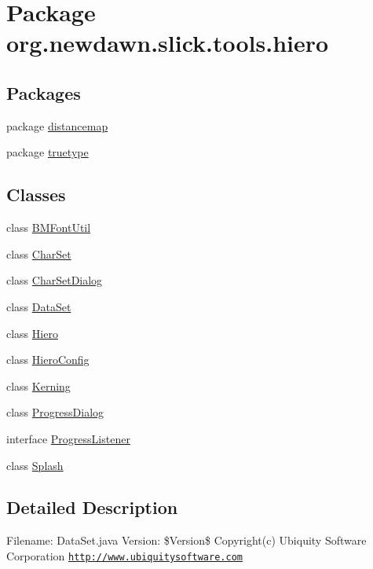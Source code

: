 \hypertarget{namespaceorg_1_1newdawn_1_1slick_1_1tools_1_1hiero}{}\section{Package org.\+newdawn.\+slick.\+tools.\+hiero}
\label{namespaceorg_1_1newdawn_1_1slick_1_1tools_1_1hiero}
\subsection*{Packages}
\begin{DoxyCompactItemize}
\item 
package \mbox{\hyperlink{namespaceorg_1_1newdawn_1_1slick_1_1tools_1_1hiero_1_1distancemap}{distancemap}}
\item 
package \mbox{\hyperlink{namespaceorg_1_1newdawn_1_1slick_1_1tools_1_1hiero_1_1truetype}{truetype}}
\end{DoxyCompactItemize}
\subsection*{Classes}
\begin{DoxyCompactItemize}
\item 
class \mbox{\hyperlink{classorg_1_1newdawn_1_1slick_1_1tools_1_1hiero_1_1_b_m_font_util}{B\+M\+Font\+Util}}
\item 
class \mbox{\hyperlink{classorg_1_1newdawn_1_1slick_1_1tools_1_1hiero_1_1_char_set}{Char\+Set}}
\item 
class \mbox{\hyperlink{classorg_1_1newdawn_1_1slick_1_1tools_1_1hiero_1_1_char_set_dialog}{Char\+Set\+Dialog}}
\item 
class \mbox{\hyperlink{classorg_1_1newdawn_1_1slick_1_1tools_1_1hiero_1_1_data_set}{Data\+Set}}
\item 
class \mbox{\hyperlink{classorg_1_1newdawn_1_1slick_1_1tools_1_1hiero_1_1_hiero}{Hiero}}
\item 
class \mbox{\hyperlink{classorg_1_1newdawn_1_1slick_1_1tools_1_1hiero_1_1_hiero_config}{Hiero\+Config}}
\item 
class \mbox{\hyperlink{classorg_1_1newdawn_1_1slick_1_1tools_1_1hiero_1_1_kerning}{Kerning}}
\item 
class \mbox{\hyperlink{classorg_1_1newdawn_1_1slick_1_1tools_1_1hiero_1_1_progress_dialog}{Progress\+Dialog}}
\item 
interface \mbox{\hyperlink{interfaceorg_1_1newdawn_1_1slick_1_1tools_1_1hiero_1_1_progress_listener}{Progress\+Listener}}
\item 
class \mbox{\hyperlink{classorg_1_1newdawn_1_1slick_1_1tools_1_1hiero_1_1_splash}{Splash}}
\end{DoxyCompactItemize}


\subsection{Detailed Description}
Filename\+: Data\+Set.\+java Version\+: \$\+Version\$ Copyright(c) Ubiquity Software Corporation \href{http://www.ubiquitysoftware.com}{\tt http\+://www.\+ubiquitysoftware.\+com} 